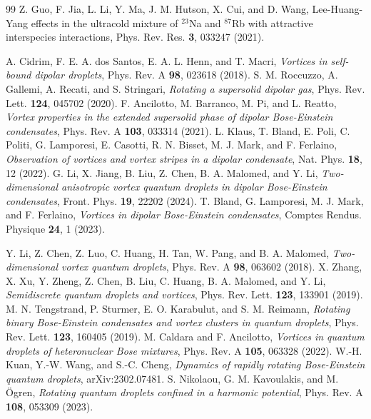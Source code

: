\documentclass[reprint,aps,pra,twocolumn,superscriptaddress]{revtex4-1}
\begin{document}
\begin{thebibliography}{99}
Z. Guo, F. Jia, L. Li, Y. Ma, J. M. Hutson, X. Cui, and D. Wang, Lee-Huang-Yang effects in the ultracold mixture of $^{23}$Na and $^{87}$Rb with attractive interspecies interactions, Phys. Rev. Res. {\bf 3}, 033247 (2021).


     A. Cidrim, F. E. A. dos Santos, E. A. L. Henn, and T. Macri, \textit{Vortices in self-bound dipolar droplets},  {Phys. Rev. A {\bf 98}, 023618 (2018)}.
     S. M. Roccuzzo, A. Gallemi, A. Recati, and S. Stringari, \textit{Rotating a supersolid dipolar gas},  {Phys. Rev. Lett. {\bf 124}, 045702 (2020)}.
     F. Ancilotto, M. Barranco, M. Pi, and L. Reatto, \textit{Vortex properties in the extended supersolid phase of dipolar Bose-Einstein condensates},  {Phys. Rev. A {\bf 103}, 033314 (2021)}.
     L. Klaus, T. Bland, E. Poli, C. Politi, G. Lamporesi, E. Casotti, R. N. Bisset, M. J. Mark, and F. Ferlaino, \textit{Observation of vortices and vortex stripes in a dipolar condensate},  {Nat. Phys. {\bf 18}, 12 (2022)}.
     G. Li, X. Jiang, B. Liu, Z. Chen, B. A. Malomed, and Y. Li, \textit{Two-dimensional anisotropic vortex quantum droplets in dipolar Bose-Einstein condensates}, Front. Phys. {\bf 19}, 22202 (2024).
     T. Bland, G. Lamporesi, M. J. Mark, and F. Ferlaino, {\it Vortices in dipolar Bose-Einstein condensates}, Comptes Rendus. Physique {\bf 24}, 1 (2023).
    
     Y. Li, Z. Chen, Z. Luo, C. Huang, H. Tan, W. Pang, and B. A. Malomed, \textit{Two-dimensional vortex quantum droplets},  {Phys. Rev. A {\bf 98}, 063602 (2018)}.
     X. Zhang, X. Xu, Y. Zheng, Z. Chen, B. Liu, C. Huang, B. A. Malomed, and Y. Li, \textit{Semidiscrete quantum droplets and vortices},  {Phys. Rev. Lett. {\bf 123}, 133901 (2019)}.
     M. N. Tengstrand, P. Sturmer, E. O. Karabulut, and S. M. Reimann, \textit{Rotating binary Bose-Einstein condensates and vortex clusters in quantum droplets},  {Phys. Rev. Lett. {\bf 123}, 160405 (2019)}.
     M. Caldara and F. Ancilotto, \textit{Vortices in quantum droplets of heteronuclear Bose mixtures},  {Phys. Rev. A {\bf 105}, 063328 (2022)}.
     W.-H. Kuan, Y.-W. Wang, and S.-C. Cheng, \textit{Dynamics of rapidly rotating Bose-Einstein quantum droplets}, arXiv:2302.07481.
     S. Nikolaou, G. M. Kavoulakis, and M. Ögren, {\it Rotating quantum droplets confined in a harmonic potential}, Phys. Rev. A {\bf 108}, 053309 (2023).


\end{thebibliography}
\end{document}
